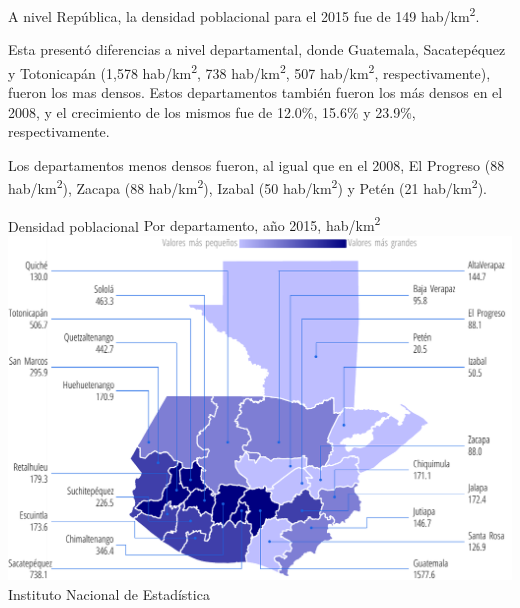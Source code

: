    
     
    
     {%
    A nivel República, la densidad poblacional para el 2015 fue de 149 hab/km\textsuperscript2.
    
    Esta presentó diferencias a nivel departamental, donde Guatemala, Sacatepéquez y Totonicapán (1,578 hab/km\textsuperscript2, 738 hab/km\textsuperscript2, 507 hab/km\textsuperscript2, respectivamente), fueron los mas densos. Estos departamentos también fueron los más densos en el 2008, y el crecimiento de los mismos fue de 12.0\%, 15.6\% y 23.9\%, respectivamente.
    
    Los departamentos menos densos fueron, al igual que en el 2008, El Progreso (88 hab/km\textsuperscript2), Zacapa (88 hab/km\textsuperscript2), Izabal (50 hab/km\textsuperscript2) y Petén (21 hab/km\textsuperscript2).
%   
 }%
     {%
     	Densidad poblacional
     } %
     {%
      Por departamento, año 2015, hab/km\textsuperscript2} %
     {%
     	\includegraphics[width=52\cuadri]{graficas/1_06.pdf}}%
     {%
     	Instituto Nacional de Estadística} %

